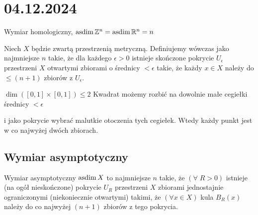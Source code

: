 \section{04.12.2024}{Wymiar homologiczny, $\operatorname{asdim} \mathbb{Z}^n=\operatorname{asdim}\mathbb{R}^n= n$}

Niech $X$ będzie zwartą przestrzenią metryczną. Definiujemy wówczas  jako najmniejsze $n$ takie, że dla każdego $\epsilon>0$ istnieje skończone pokrycie $U_\epsilon$ przestrzeni $X$ otwartymi zbiorami o średnicy $<\epsilon$ takie, że każdy $x\in X$ należy do $\leq (n+1)$ zbiorów z $U_\epsilon$.

\begin{example}
  $\dim([0,1]\times[0,1])\leq 2$
  Kwadrat możemy rozbić na dowolnie małe cegiełki średnicy $<\epsilon$
  \begin{center}
  \end{center}
  i jako pokrycie wybrać malutkie otoczenia tych cegiełek. Wtedy każdy punkt jest w co najwyżej dwóch zbiorach.
\end{example}

\subsection{Wymiar asymptotyczny}

\begin{definition}{}{}
  Wymiar asymptotyczny $\operatorname{asdim} X$ to najmniejsze $n$ takie, że $(\forall\;R>0)$ istnieje (na ogół nieskończone) pokrycie $U_R$ przestrzeni $X$ zbiorami jednostajnie ograniczonymi (niekoniecznie otwartymi) takimi, że $(\forall x\in X)$ kula $B_R(x)$ należy do co najwyżej $(n+1)$ zbiorów z tego pokrycia.
\end{definition}

